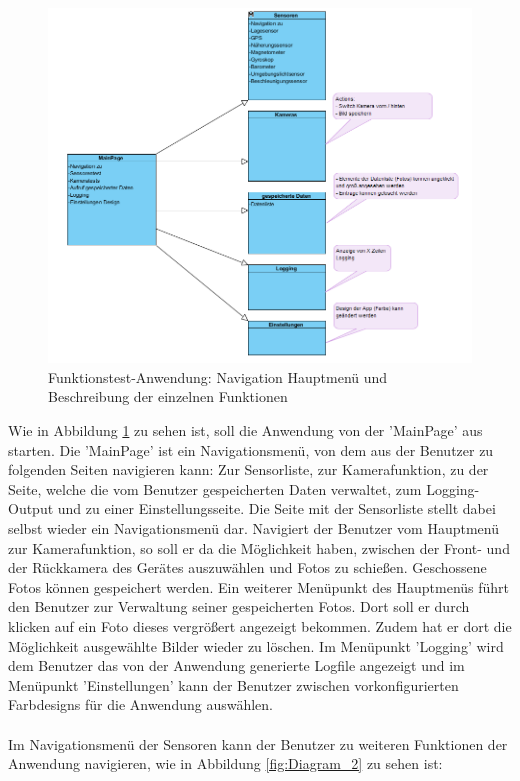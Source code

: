 \begin{figure}[h]
	\centering
	\includegraphics[width=1\textwidth]{Bilder/Diagram_1.PNG}
	\caption{Funktionstest-Anwendung: Navigation Hauptmenü und Beschreibung der einzelnen Funktionen}
	\label{fig:Diagram_1}
\end{figure}

Wie in Abbildung \ref{fig:Diagram_1} zu sehen ist, soll die Anwendung von der 'MainPage' aus starten. Die 'MainPage' ist ein Navigationsmenü, von dem aus der Benutzer zu folgenden Seiten navigieren kann: Zur Sensorliste, zur Kamerafunktion, zu der Seite, welche die vom Benutzer gespeicherten Daten verwaltet, zum Logging-Output und zu einer Einstellungsseite. Die Seite mit der Sensorliste stellt dabei selbst wieder ein Navigationsmenü dar. Navigiert der Benutzer vom Hauptmenü zur Kamerafunktion, so soll er da die Möglichkeit haben, zwischen der Front- und der Rückkamera des Gerätes auszuwählen und Fotos zu schießen. Geschossene Fotos können gespeichert werden. Ein weiterer Menüpunkt des Hauptmenüs führt den Benutzer zur Verwaltung seiner gespeicherten Fotos. Dort soll er durch klicken auf ein Foto dieses vergrößert angezeigt bekommen. Zudem hat er dort die Möglichkeit ausgewählte Bilder wieder zu löschen. Im Menüpunkt 'Logging' wird dem Benutzer das von der Anwendung generierte Logfile angezeigt und im Menüpunkt 'Einstellungen' kann der Benutzer zwischen vorkonfigurierten Farbdesigns für die Anwendung auswählen. 
\\
\\
Im Navigationsmenü der Sensoren kann der Benutzer zu weiteren Funktionen der Anwendung navigieren, wie in Abbildung \ref{fig:Diagram_2} zu sehen ist: 


